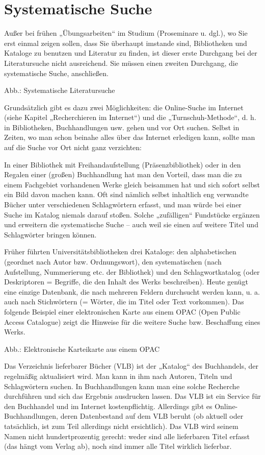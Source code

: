\documentclass[]{book}
\theoremstyle{definition}
\theoremstyle{definition}
\theoremstyle{definition}
\theoremstyle{remark}
\begin{document}
\section{Systematische Suche}\label{systematische-suche}

Außer bei frühen „Übungsarbeiten`` im Studium (Proseminare u. dgl.), wo
Sie erst einmal zeigen sollen, dass Sie überhaupt imstande sind,
Bibliotheken und Kataloge zu benutzen und Literatur zu finden, ist
dieser erste Durchgang bei der Literatursuche nicht ausreichend. Sie
müssen einen zweiten Durchgang, die systematische Suche, anschließen.

Abb.: Systematische Literatursuche

Grundsätzlich gibt es dazu zwei Möglichkeiten: die Online-Suche im
Internet (siehe Kapitel „Recherchieren im Internet``) und die
„Turnschuh-Methode``, d. h. in Bibliotheken, Buchhandlungen usw. gehen
und vor Ort suchen. Selbst in Zeiten, wo man schon beinahe alles über
das Internet erledigen kann, sollte man auf die Suche vor Ort nicht ganz
verzichten:

In einer Bibliothek mit Freihandaufstellung (Präsenzbibliothek) oder in
den Regalen einer (großen) Buchhandlung hat man den Vorteil, dass man
die zu einem Fachgebiet vorhandenen Werke gleich beisammen hat und sich
sofort selbst ein Bild davon machen kann. Oft sind nämlich selbst
inhaltlich eng verwandte Bücher unter verschiedenen Schlagwörtern
erfasst, und man würde bei einer Suche im Katalog niemals darauf stoßen.
Solche „zufälligen`` Fundstücke ergänzen und erweitern die systematische
Suche -- auch weil sie einen auf weitere Titel und Schlagwörter bringen
können.

Früher führten Universitätsbibliotheken drei Kataloge: den
alphabetischen (geordnet nach Autor bzw. Ordnungswort), den
systematischen (nach Aufstellung, Nummerierung etc. der Bibliothek) und
den Schlagwortkatalog (oder Deskriptoren = Begriffe, die den Inhalt des
Werks beschreiben). Heute genügt eine einzige Datenbank, die nach
mehreren Feldern durchsucht werden kann, u. a. auch nach Stichwörtern (=
Wörter, die im Titel oder Text vorkommen). Das folgende Beispiel einer
elektronischen Karte aus einem OPAC (Open Public Access Catalogue) zeigt
die Hinweise für die weitere Suche bzw. Beschaffung eines Werks.

Abb.: Elektronische Karteikarte aus einem OPAC

Das Verzeichnis lieferbarer Bücher (VLB) ist der „Katalog`` des
Buchhandels, der regelmäßig aktualisiert wird. Man kann in ihm nach
Autoren, Titeln und Schlagwörtern suchen. In Buchhandlungen kann man
eine solche Recherche durchführen und sich das Ergebnis ausdrucken
lassen. Das VLB ist ein Service für den Buchhandel und im Internet
kostenpflichtig. Allerdings gibt es Online-Buchhandlungen, deren
Datenbestand auf dem VLB beruht (ob aktuell oder tatsächlich, ist zum
Teil allerdings nicht ersichtlich). Das VLB wird seinem Namen nicht
hundertprozentig gerecht: weder sind alle lieferbaren Titel erfasst (das
hängt vom Verlag ab), noch sind immer alle Titel wirklich lieferbar.
\end{document}
